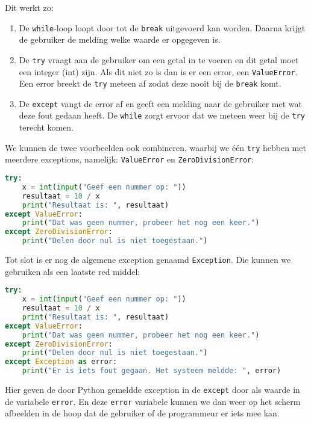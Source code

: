 Dit werkt zo:
\begin{enumerate}
	\item De \texttt{while}-loop loopt door tot de \texttt{break} uitgevoerd kan worden. Daarna krijgt de gebruiker de melding welke waarde er opgegeven is.
	\item De \texttt{try} vraagt aan de gebruiker om een getal in te voeren en dit getal moet een integer (int) zijn. Als dit niet zo is dan is er een error, een \texttt{ValueError}. Een error breekt de \texttt{try} meteen af zodat deze nooit bij de \texttt{break} komt.
	\item De \texttt{except} vangt de error af en geeft een melding naar de gebruiker met wat deze fout gedaan heeft. De \texttt{while} zorgt ervoor dat we meteen weer bij de \texttt{try} terecht komen.
\end{enumerate}

We kunnen de twee voorbeelden ook combineren, waarbij we \'e\'en \texttt{try} hebben met meerdere exceptions, namelijk: \texttt{ValueError} en \texttt{ZeroDivisionError}:
\begin{lstlisting}[language=python]
try:
    x = int(input("Geef een nummer op: "))
    resultaat = 10 / x
    print("Resultaat is: ", resultaat)
except ValueError:
    print("Dat was geen nummer, probeer het nog een keer.")
except ZeroDivisionError:
    print("Delen door nul is niet toegestaan.")
\end{lstlisting}

Tot slot is er nog de algemene exception genaamd \texttt{Exception}. Die kunnen we gebruiken als een laatste red middel:
\begin{lstlisting}[language=python]
try:
    x = int(input("Geef een nummer op: "))
    resultaat = 10 / x
    print("Resultaat is: ", resultaat)
except ValueError:
    print("Dat was geen nummer, probeer het nog een keer.")
except ZeroDivisionError:
    print("Delen door nul is niet toegestaan.")
except Exception as error:
    print("Er is iets fout gegaan. Het systeem meldde: ", error)
\end{lstlisting}
Hier geven de door Python gemeldde exception in de \texttt{except} door als waarde in de variabele \texttt{error}. En deze \texttt{error} variabele kunnen we dan weer op het scherm afbeelden in de hoop dat de gebruiker of de programmeur er iets mee kan.

